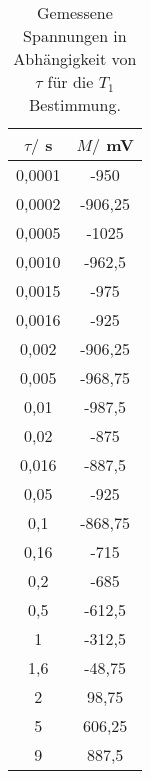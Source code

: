 \begin{table}[!htp]
\centering
\caption{Gemessene Spannungen in Abhängigkeit von $\tau$ für die $T_1$ Bestimmung.}
\label{tab:t1}
\begin{tabular}{c c}
\toprule
{$\tau /$ s} & {$M /$ mV} \\
\midrule
0,0001 & -950 \\
0,0002 & -906,25 \\
0,0005 & -1025 \\
0,0010 & -962,5 \\
0,0015 & -975 \\
0,0016 & -925 \\
0,002 & -906,25 \\
0,005 & -968,75 \\
0,01 & -987,5 \\
0,02 & -875 \\
0,016 & -887,5 \\
0,05 & -925 \\
0,1 & -868,75 \\
0,16 & -715 \\
0,2 & -685 \\
0,5 & -612,5 \\
1 & -312,5 \\
1,6 & -48,75 \\
2 & 98,75 \\
5 & 606,25 \\
9 & 887,5 \\
\bottomrule
\end{tabular}
\end{table}